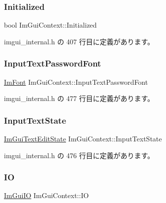 \subsubsection{\texorpdfstring{Initialized}{Initialized}}
{\footnotesize\ttfamily bool Im\+Gui\+Context\+::\+Initialized}



 imgui\+\_\+internal.\+h の 407 行目に定義があります。

\mbox{\label{struct_im_gui_context_a6aa67b9b778bd741d9866ec34cc8ee8b}} 
\subsubsection{\texorpdfstring{Input\+Text\+Password\+Font}{InputTextPasswordFont}}
{\footnotesize\ttfamily \mbox{\hyperlink{struct_im_font}{Im\+Font}} Im\+Gui\+Context\+::\+Input\+Text\+Password\+Font}



 imgui\+\_\+internal.\+h の 477 行目に定義があります。

\mbox{\label{struct_im_gui_context_ae8626ef18bc5a848691a0c50e2c0f7ae}} 
\subsubsection{\texorpdfstring{Input\+Text\+State}{InputTextState}}
{\footnotesize\ttfamily \mbox{\hyperlink{struct_im_gui_text_edit_state}{Im\+Gui\+Text\+Edit\+State}} Im\+Gui\+Context\+::\+Input\+Text\+State}



 imgui\+\_\+internal.\+h の 476 行目に定義があります。

\mbox{\label{struct_im_gui_context_add4fdcc8c6a437d8f8e7c837418be83c}} 
\subsubsection{\texorpdfstring{IO}{IO}}
{\footnotesize\ttfamily \mbox{\hyperlink{struct_im_gui_i_o}{Im\+Gui\+IO}} Im\+Gui\+Context\+::\+IO}



